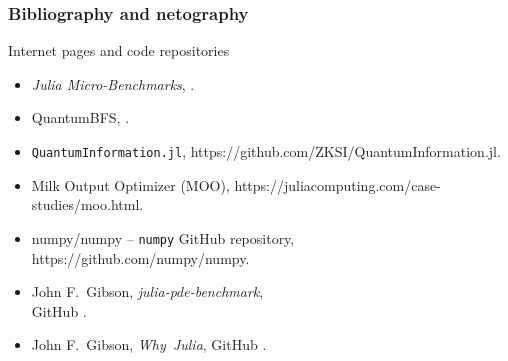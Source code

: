 \documentclass[10pt,t]{beamer}
\begin{document}
\begin{frame}
  \frametitle{Bibliography and netography}


  Internet pages and code repositories
  \begin{itemize}
    \RaggedRight

  \item \textit{Julia Micro-Benchmarks},
    .

  \item QuantumBFS, .

  \item \texttt{QuantumInformation.jl},
    {https://github.com/ZKSI/QuantumInformation.jl}.

  \item Milk Output Optimizer (MOO),
    {https://juliacomputing.com/case-studies/moo.html}.

  \item numpy/numpy -- \texttt{numpy} GitHub repository, \\
    {https://github.com/numpy/numpy}.

  \item John F.~Gibson, \textit{julia-pde-benchmark}, \\
    GitHub
    .

  \item John F.~Gibson, \textit{Why~Julia}, GitHub
    .

  \end{itemize}

\end{frame}












{}






\end{document}
